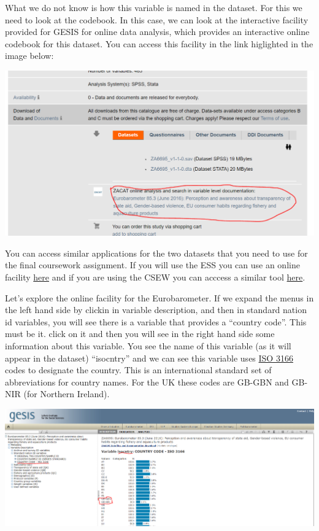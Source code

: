 \documentclass[]{book}
\theoremstyle{definition}
\theoremstyle{definition}
\theoremstyle{definition}
\theoremstyle{remark}
\begin{document}
What we do not know is how this variable is named in the dataset. For
this we need to look at the codebook. In this case, we can look at the
interactive facility provided for GESIS for online data analysis, which
provides an interactive online codebook for this dataset. You can access
this facility in the link higlighted in the image below:

\includegraphics{imgs/linktoonline.PNG}

You can access similar applications for the two datasets that you need
to use for the final coursework assignment. If you will use the ESS you
can use an online facility
\href{http://nesstar.ess.nsd.uib.no/webview/}{here} and if you are using
the CSEW you can acccess a similar tool
\href{http://nesstar.ukdataservice.ac.uk/webview/}{here}.

Let's explore the online facility for the Eurobarometer. If we expand
the menus in the left hand side by clickin in variable description, and
then in standard nation id variables, you will see there is a variable
that provides a ``country code''. This must be it. click on it and then
you will see in the right hand side some information about this
variable. You see the name of this variable (as it will appear in the
dataset) ``isocntry'' and we can see this variable uses
\href{https://en.wikipedia.org/wiki/ISO_3166}{ISO 3166} codes to
designate the country. This is an international standard set of
abbreviations for country names. For the UK these codes are GB-GBN and
GB-NIR (for Northern Ireland).

\includegraphics{imgs/country.PNG}
\end{document}
